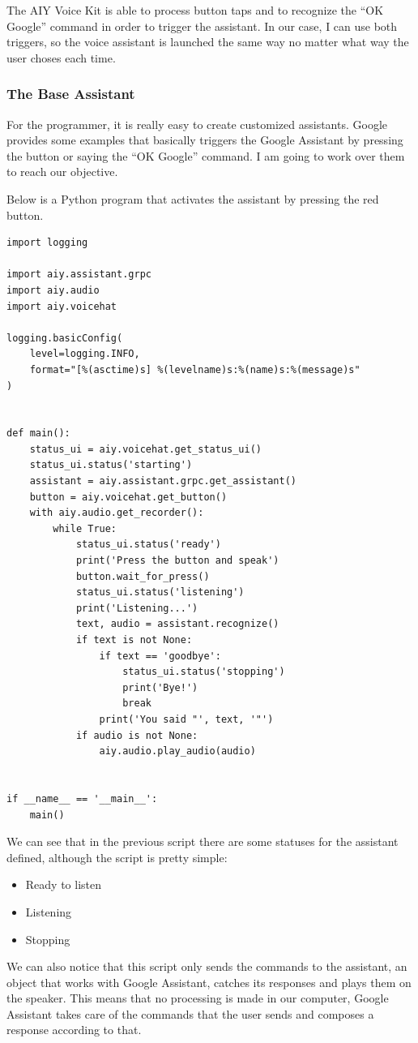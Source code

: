 The AIY Voice Kit is able to process button taps and to recognize the “OK Google” command in order to trigger the assistant. In 
our case, I can use both triggers, so the voice assistant is launched the same way no matter what way the user choses each time. 

\subsubsection{The Base Assistant}
For the programmer, it is really easy to create customized assistants. Google provides some examples that basically triggers the 
Google Assistant by pressing the button or saying the “OK Google” command. I am going to work over them to reach our objective.

Below is a Python program that activates the assistant by pressing the red button.

\begin{lstlisting}[style=PythonCode]
import logging

import aiy.assistant.grpc
import aiy.audio
import aiy.voicehat

logging.basicConfig(
	level=logging.INFO,
	format="[%(asctime)s] %(levelname)s:%(name)s:%(message)s"
)


def main():
	status_ui = aiy.voicehat.get_status_ui()
	status_ui.status('starting')
	assistant = aiy.assistant.grpc.get_assistant()
	button = aiy.voicehat.get_button()
	with aiy.audio.get_recorder():
		while True:
			status_ui.status('ready')
			print('Press the button and speak')
			button.wait_for_press()
			status_ui.status('listening')
			print('Listening...')
			text, audio = assistant.recognize()
			if text is not None:
				if text == 'goodbye':
					status_ui.status('stopping')
					print('Bye!')
					break
				print('You said "', text, '"')
			if audio is not None:
				aiy.audio.play_audio(audio)


if __name__ == '__main__':
	main()
\end{lstlisting}

We can see that in the previous script there are some statuses for the assistant defined, although the script is pretty simple:
\begin{itemize}
	\item Ready to listen
	\item Listening
	\item Stopping
\end{itemize}

We can also notice that this script only sends the commands to the assistant, an object that works with Google Assistant, catches 
its responses and plays them on the speaker. This means that no processing is made in our computer, Google Assistant takes care 
of the commands that the user sends and composes a response according to that.

